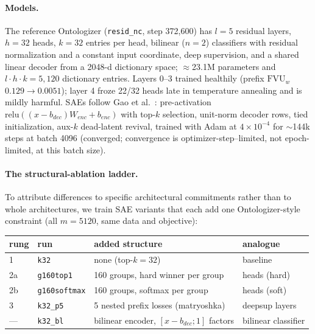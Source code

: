\documentclass[11pt]{article}
\newcommand{\fvu}{\mathrm{FVU}_w}
\begin{document}
\paragraph{Models.}
The reference Ontologizer (\texttt{resid\_nc}, step 372{,}600) has $l{=}5$
residual layers, $h{=}32$ heads, $k{=}32$ entries per head, bilinear
($n{=}2$) classifiers with residual normalization and a constant input
coordinate, deep supervision, and a shared linear decoder from a 2048-d
dictionary space; $\approx$23.1M parameters and $l\cdot h\cdot k = 5{,}120$
dictionary entries. Layers 0--3 trained healthily (prefix $\fvu$
$0.129 \to 0.0051$); layer 4 froze 22/32 heads late in temperature
annealing and is mildly harmful. SAEs follow Gao et al.~\cite{gao2024}:
pre-activation $\mathrm{relu}((x-b_{dec})W_{enc}+b_{enc})$ with top-$k$
selection, unit-norm decoder rows, tied initialization, aux-$k$ dead-latent
revival, trained with Adam at $4\times10^{-4}$ for $\sim$144k steps at
batch 4096 (converged; convergence is optimizer-step--limited, not
epoch-limited, at this batch size).

\paragraph{The structural-ablation ladder.}
To attribute differences to specific architectural commitments rather than
to whole architectures, we train SAE variants that each add one
Ontologizer-style constraint (all $m{=}5120$, same data and objective):

\begin{center}
\begin{tabular}{@{}llll@{}}
\toprule
rung & run & added structure & analogue \\
\midrule
1  & \texttt{k32} & none (top-$k{=}32$) & baseline \\
2a & \texttt{g160top1} & 160 groups, hard winner per group & heads (hard) \\
2b & \texttt{g160softmax} & 160 groups, softmax per group & heads (soft) \\
3  & \texttt{k32\_p5} & 5 nested prefix losses (matryoshka) & deepsup layers \\
--- & \texttt{k32\_bl} & bilinear encoder, $[x{-}b_{dec};1]$ factors & bilinear classifier \\
\bottomrule
\end{tabular}
\end{center}
\end{document}

